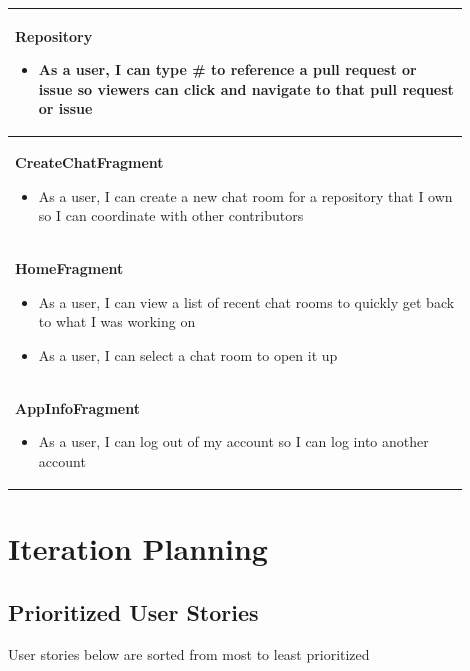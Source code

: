 \documentclass{report}
\begin{document}
\begin{center}
\begin{tabular}{ | p{0.9\linewidth} |}
        \hline
        \textbf{Repository} \begin{itemize}
                                \item As a user, I can type \# to reference a pull request or issue so viewers can click and navigate to that pull request or issue
                            \end{itemize} \\
        \hline
        \textbf{CreateChatFragment} \begin{itemize}
                                        \item As a user, I can create a new chat room for a repository that I own so I can coordinate with other contributors
                                    \end{itemize}       \\
        \hline
        \textbf{HomeFragment} \begin{itemize}
                                  \item As a user, I can view a list of recent chat rooms to quickly get back to what I was working on
                                  \item As a user, I can select a chat room to open it up
                              \end{itemize}                              \\
        \hline
        \textbf{AppInfoFragment} \begin{itemize}
                \item As a user, I can log out of my account so I can log into another account
        \end{itemize} \\
        \hline
    \end{tabular}
\end{center}



\chapter{Iteration Planning}

\section{Prioritized User Stories}

User stories below are sorted from most to least prioritized
\end{document}
